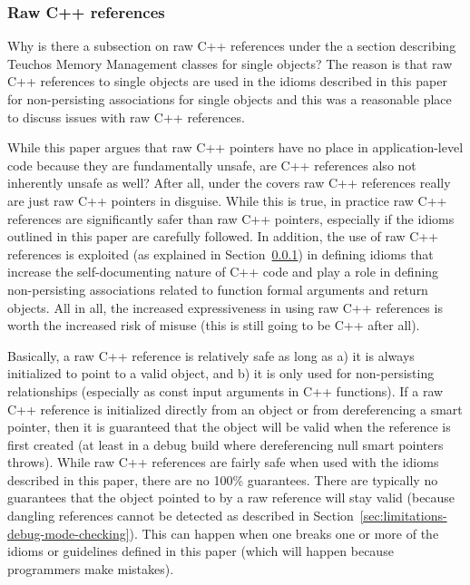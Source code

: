 \documentclass[pdf,ps2pdf,11pt]{SANDreport}
\begin{document}
%
{}\subsubsection{Raw C++ references}
\label{sec:raw-C++-references}
%

Why is there a subsection on raw C++ references under the a section
describing Teuchos Memory Management classes for single objects?  The
reason is that raw C++ references to single objects are used in the
idioms described in this paper for non-persisting associations for
single objects and this was a reasonable place to discuss issues with
raw C++ references.

While this paper argues that raw C++ pointers have no place in
application-level code because they are fundamentally unsafe, are C++
references also not inherently unsafe as well?  After all, under the
covers raw C++ references really are just raw C++ pointers in
disguise.  While this is true, in practice raw C++ references are
significantly safer than raw C++ pointers, especially if the idioms
outlined in this paper are carefully followed.  In addition, the use
of raw C++ references is exploited (as explained in
Section~\ref{sec:raw-C++-references}) in defining idioms that increase
the self-documenting nature of C++ code and play a role in defining
non-persisting associations related to function formal arguments and
return objects.  All in all, the increased expressiveness in using raw
C++ references is worth the increased risk of misuse (this is still
going to be C++ after all).

Basically, a raw C++ reference is relatively safe as long as a) it is always
initialized to point to a valid object, and b) it is only used for
non-persisting relationships (especially as const input arguments in C++
functions).  If a raw C++ reference is initialized directly from an object or
from dereferencing a smart pointer, then it is guaranteed that the object will
be valid when the reference is first created (at least in a debug build where
dereferencing null smart pointers throws).  While raw C++ references are
fairly safe when used with the idioms described in this paper, there are no
100\% guarantees.  There are typically no guarantees that the object pointed
to by a raw reference will stay valid (because dangling references cannot be
detected as described in Section~\ref{sec:limitations-debug-mode-checking}).
This can happen when one breaks one or more of the idioms or guidelines
defined in this paper (which will happen because programmers make mistakes).
\end{document}
